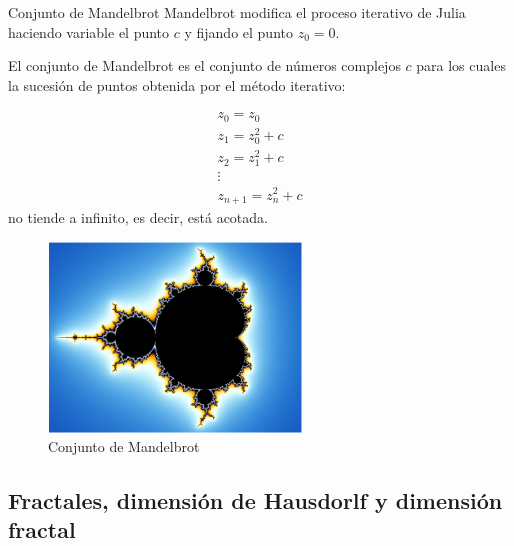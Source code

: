 \documentclass[8pt]{beamer}
\begin{document}
\begin{frame}
\begin{block}{Conjunto de Mandelbrot}
Mandelbrot modifica el proceso iterativo de Julia haciendo variable el punto $c$ y fijando el punto $z_0=0$.
\end{block}

El conjunto de Mandelbrot es el conjunto de números complejos $c$ para los cuales la sucesión de puntos obtenida por el método iterativo:

\begin{minipage}{0.3\textwidth}
\[\begin{array}{l}
z_0=z_0\\
z_1=z_0^2+c \\
z_2 = z_1^2 + c \\
\vdots \\
z_{n+1} = z_n^2+c
\end{array}\]
no tiende a infinito, es decir, está acotada.
\end{minipage}
\begin{minipage}{0.68\textwidth}
\begin{figure}[hbtp]
\centering
\includegraphics[width = 0.6\textwidth]{img/Mandelbrot_set.png}
\caption{Conjunto de Mandelbrot}
\label{fig:Mandelbrot}
\end{figure}
\end{minipage}
\end{frame}

\subsection{Fractales, dimensión de Hausdorlf y dimensión fractal}
\end{document}
